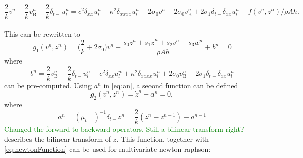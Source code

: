 \documentclass{article}
\def\SWcomment[#1]{\textcolor{Green}{#1}}
\begin{document}
\begin{equation}
\label{eq:stiffStringFDS}
\frac{2}{k}v^n + \frac{2}{k}v_\text{B}^n - \frac{2}{k}\delta_{t-}u_l^n =c^2 \delta_{xx} u_l^n -\kappa^2\delta_{xxxx} u_l^n - 2\sigma_0v^n - 2\sigma_0v_\text{B}^n
+ 2\sigma_1\delta_{t-}\delta_{xx}u_l^n - f(v^n, z^n)/\rho Ah.
\end{equation}
\\
This can be rewritten to
\begin{equation}\label{eq:newtonFunction}
g_1(v^n, z^n) = \Big(\frac{2}{k} + 2\sigma_0\Big)v^n + \frac{s_0z^n+s_1\dot{z}^n+s_2v^n+s_3w^n}{\rho A h} + b^n = 0 \end{equation}
where
\begin{equation}
    b^n = \frac{2}{k}v_\text{B}^n-\frac{2}{k}\delta_{t-}u_l^n - c^2 \delta_{xx} u_l^n +\kappa^2\delta_{xxxx} u_l^n + 2\sigma_0v_\text{B}^n
- 2\sigma_1\delta_{t-}\delta_{xx}u_l^n
\end{equation}
can be pre-computed. Using $a^n$ in \eqref{eq:an}, a second function can be defined
\begin{equation}
   g_2(v^n,z^n) = \dot{z}^n -  a^n = 0,
\end{equation}
where
\begin{equation}\label{eq:an}
    a^n = (\mu_{t-})^{-1}\delta_{t-}z^n = \frac{2}{k}(z^n-z^{n-1})-a^{n-1}
\end{equation} \SWcomment[Changed the forward to backward operators. Still a bilinear transform right?]{}
describes the bilinear transform of $z$. 
This function, together with \eqref{eq:newtonFunction} can be used for multivariate newton raphson:
\end{document}
